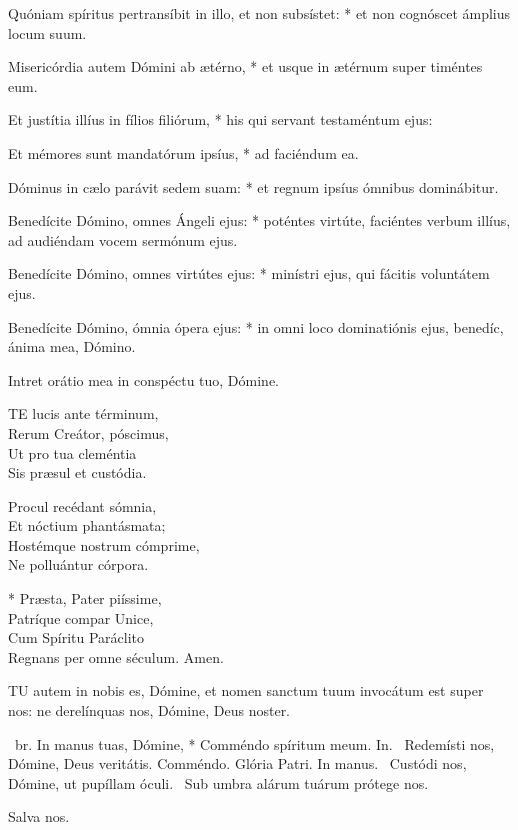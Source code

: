 Quóniam spíritus pertransíbit in illo, et non subsístet: * et non cognóscet ámplius locum suum.

Misericórdia autem Dómini ab ætérno, * et usque in ætérnum super timéntes eum.

Et justítia illíus in fílios filiórum, * his qui servant testaméntum ejus:

Et mémores sunt mandatórum ipsíus, * ad faciéndum ea.

Dóminus in cælo parávit sedem suam: * et regnum ipsíus ómnibus dominábitur.

Benedícite Dómino, omnes Ángeli ejus: * poténtes virtúte, faciéntes verbum illíus, ad audiéndam vocem sermónum ejus.

Benedícite Dómino, omnes virtútes ejus: * minístri ejus, qui fácitis voluntátem ejus.

Benedícite Dómino, ómnia ópera ejus: * in omni loco dominatiónis ejus, benedíc, ánima mea, Dómino.

 Intret orátio mea in conspéctu tuo, Dómine.


\lettrine[lines=2]{T}{E} lucis ante términum,\\
Rerum Creátor, póscimus,\\
Ut pro tua cleméntia\\
Sis præsul et custódia.

Procul recédant sómnia,\\
Et nóctium phantásmata;\\
Hostémque nostrum cómprime,\\
Ne polluántur córpora.

* Præsta, Pater piíssime,\\
Patríque compar Unice,\\
Cum Spíritu Paráclito\\
Regnans per omne séculum. Amen.


\lettrine[lines=2]{T}{U} autem in nobis es, Dómine, et nomen sanctum tuum invocátum est super nos: ne derelínquas nos, Dómine, Deus noster.

\R\ br. In manus tuas, Dómine, * Comméndo spíritum meum. In. \V\ Redemísti nos, Dómine, Deus veritátis. Comméndo. Glória Patri. In manus. \V\ Custódi nos, Dómine, ut pupíllam óculi. \R\ Sub umbra alárum tuárum prótege nos.

 Salva nos.


